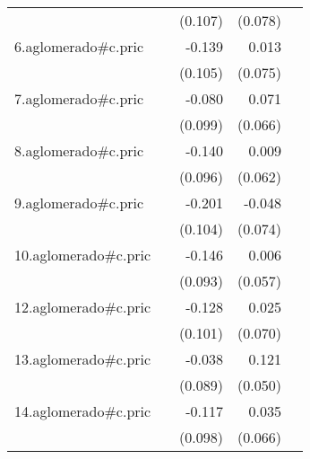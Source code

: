 {\begin{longtable}{l*{4}{D{.}{.}{-1}}}
            &                     &     (0.107)         &     (0.078)         &                     \\
\addlinespace
6.aglomerado#c.pric&                     &      -0.139         &       0.013         &                     \\
            &                     &     (0.105)         &     (0.075)         &                     \\
\addlinespace
7.aglomerado#c.pric&                     &      -0.080         &       0.071         &                     \\
            &                     &     (0.099)         &     (0.066)         &                     \\
\addlinespace
8.aglomerado#c.pric&                     &      -0.140         &       0.009         &                     \\
            &                     &     (0.096)         &     (0.062)         &                     \\
\addlinespace
9.aglomerado#c.pric&                     &      -0.201         &      -0.048         &                     \\
            &                     &     (0.104)         &     (0.074)         &                     \\
\addlinespace
10.aglomerado#c.pric&                     &      -0.146         &       0.006         &                     \\
            &                     &     (0.093)         &     (0.057)         &                     \\
\addlinespace
12.aglomerado#c.pric&                     &      -0.128         &       0.025         &                     \\
            &                     &     (0.101)         &     (0.070)         &                     \\
\addlinespace
13.aglomerado#c.pric&                     &      -0.038         &       0.121\sym{*}  &                     \\
            &                     &     (0.089)         &     (0.050)         &                     \\
\addlinespace
14.aglomerado#c.pric&                     &      -0.117         &       0.035         &                     \\
            &                     &     (0.098)         &     (0.066)         &                     \\

\end{longtable}}
